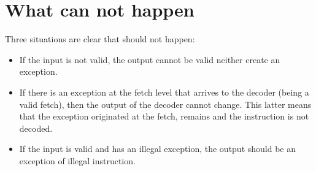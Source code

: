 \section{What can not happen}
Three situations are clear that should not happen:

\begin{itemize}
	\item If the input is not valid, the output cannot be valid neither create an exception.
	\item If there is an exception at the fetch level that arrives to the decoder (being a valid fetch), then the output of the decoder cannot change. This latter means that the exception originated at the fetch, remains and the instruction is not decoded.
	\item If the input is valid and has an illegal exception, the output should be an exception of illegal instruction.
	
\end{itemize}

    